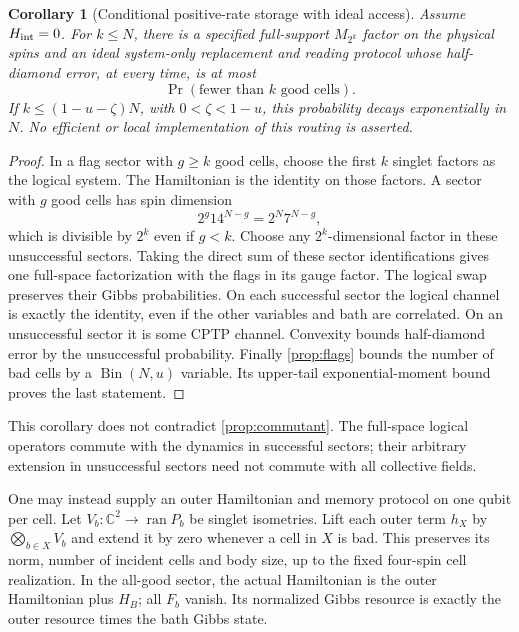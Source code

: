 \documentclass[11pt,reqno]{amsart}
\numberwithin{equation}{section}
\newtheorem{corollary}[theorem]{Corollary}
\theoremstyle{definition}
\theoremstyle{remark}
\newcommand{\ran}{\operatorname{ran}}
\begin{document}
\begin{corollary}[Conditional positive-rate storage with ideal access]
\label{cor:singlet-routing}
Assume \(H_{\rm int}=0\). For \(k\le N\), there is a specified
full-support \(M_{2^k}\) factor on the physical spins and an ideal
system-only replacement and reading protocol whose half-diamond error,
at every time, is at most
\[
                         \Pr(\text{fewer than }k\text{ good cells}).
\]
If \(k\le(1-u-\zeta)N\), with \(0<\zeta<1-u\), this probability
decays exponentially in \(N\).
No efficient or local implementation of this routing is asserted.
\end{corollary}
\begin{proof}
In a flag sector with \(g\ge k\) good cells, choose the first \(k\)
singlet factors as the logical system. The Hamiltonian is the identity
on those factors. A sector with \(g\) good cells has spin dimension
\[
                           2^g14^{N-g}=2^N7^{N-g},
\]
which is divisible by \(2^k\) even if \(g<k\).
Choose any \(2^k\)-dimensional factor in these unsuccessful sectors.
Taking the direct sum of these sector identifications gives one
full-space factorization with the flags in its gauge factor.
The logical swap preserves their Gibbs probabilities.
On each successful sector the logical channel is exactly the identity,
even if the other variables and bath are correlated.
On an unsuccessful sector it is some CPTP channel.
Convexity bounds half-diamond error by the unsuccessful probability.
Finally \cref{prop:flags} bounds the number of bad cells by a
\(\operatorname{Bin}(N,u)\) variable. Its upper-tail exponential-moment
bound proves the last statement.
\end{proof}

This corollary does not contradict \cref{prop:commutant}.
The full-space logical operators commute with the dynamics in successful
sectors; their arbitrary extension in unsuccessful sectors need not
commute with all collective fields.

One may instead supply an outer Hamiltonian and memory protocol on one
qubit per cell. Let \(V_b:\mathbb C^2\to\ran P_b\) be singlet isometries.
Lift each outer term \(h_X\) by \(\bigotimes_{b\in X}V_b\) and extend it
by zero whenever a cell in \(X\) is bad. This preserves its norm,
number of incident cells and body size, up to the fixed four-spin
cell realization. In the all-good sector, the actual Hamiltonian is
the outer Hamiltonian plus \(H_B\); all \(F_b\) vanish. Its normalized
Gibbs resource is exactly the outer resource times the bath Gibbs state.
\end{document}
